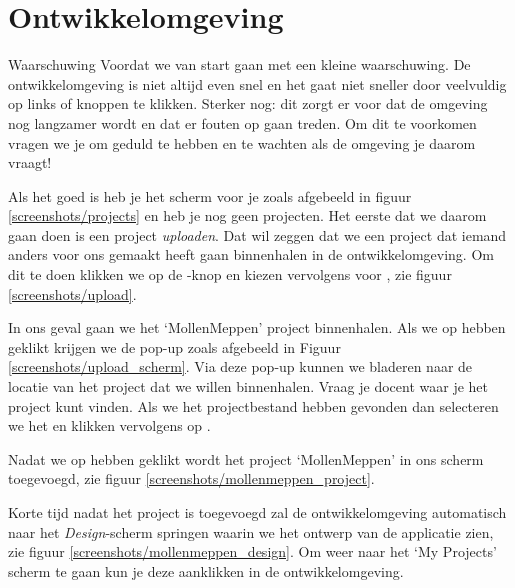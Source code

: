 \chapter{Ontwikkelomgeving}
\label{chap:ontwikkelomgeving}

\begin{derivation}{Waarschuwing}
Voordat we van start gaan met \ai een kleine waarschuwing. De ontwikkelomgeving is niet altijd even snel en het gaat niet sneller door veelvuldig op links of knoppen te klikken. Sterker nog: dit zorgt er voor dat de omgeving nog langzamer wordt en dat er fouten op gaan treden. Om dit te voorkomen vragen we je om geduld te hebben en te wachten als de omgeving je daarom vraagt!
\end{derivation}

Als het goed is heb je het scherm voor je zoals afgebeeld in figuur \ref{screenshots/projects} en heb je nog geen projecten. Het eerste dat we daarom gaan doen is een project \emph{uploaden}. Dat wil zeggen dat we een project dat iemand anders voor ons gemaakt heeft gaan binnenhalen in de  ontwikkelomgeving. Om dit te doen klikken we op de -knop en kiezen vervolgens voor , zie figuur \ref{screenshots/upload}.


In ons geval gaan we het `MollenMeppen' project binnenhalen. Als we op  hebben geklikt krijgen we de pop-up zoals afgebeeld in Figuur \ref{screenshots/upload_scherm}. Via deze pop-up kunnen we bladeren naar de locatie van het project dat we willen binnenhalen. Vraag je docent waar je het project kunt vinden.
Als we het projectbestand hebben gevonden dan selecteren we het en klikken vervolgens op .
 
Nadat  we op  hebben geklikt wordt het project `MollenMeppen' in ons scherm toegevoegd, zie figuur \ref{screenshots/mollenmeppen_project}.


Korte tijd nadat het project is toegevoegd zal de ontwikkelomgeving automatisch naar het \emph{Design}-scherm springen waarin we het ontwerp van de applicatie zien, zie figuur \ref{screenshots/mollenmeppen_design}. Om weer naar het `My Projects' scherm te gaan kun je deze aanklikken in de ontwikkelomgeving.
